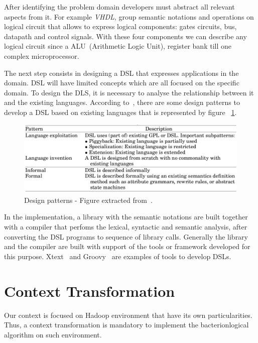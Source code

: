 After identifying the problem domain developers must abstract all relevant 
aspects from it. For example {\it VHDL}, group semantic notations and operations
on logical circuit that allows to express logical components: gates circuits, bus, datapath and
control signals. With these four components we can describe any logical circuit
since a ALU~(Arithmetic Logic Unit), register bank till one complex microprocessor. 

The next step consists in designing a DSL that expresses applications in the domain. DSL
will have limited concepts which are all focused on the specific domain. To
design the DLS, it is necessary to analyse the relationship between it and the existing
languages. According to~\cite{mernik:2005}, there are some design patterns to
develop a DSL based on existing languages that is represented by figure ~\ref{fig:patterns}.

\begin{figure}[htbp]
        \centering
        \includegraphics[width=\columnwidth]{img/designPatterns.png}
        \caption{Design patterns - Figure extracted from~\cite{mernik:2005}.}\label{fig:patterns}
\end{figure}

In the implementation, a library with the semantic notations are built
together with a compiler that perfoms the lexical, syntactic and semantic analysis, 
after converting the DSL programs to sequence of library calls. Generally the library
and the compiler are built with support of the tools or framework developed
for this purpose. Xtext~\cite{xtext} and Groovy~\cite{groovyDSL, groovyDSLBook}
are examples of tools to develop DSLs.

\section{Context Transformation}
\label{sec:contextTrans}

Our context is focused on Hadoop environment that have its own particularities. Thus,
a context transformation is mandatory to implement the bacterionlogical algorithm
on such environment.


